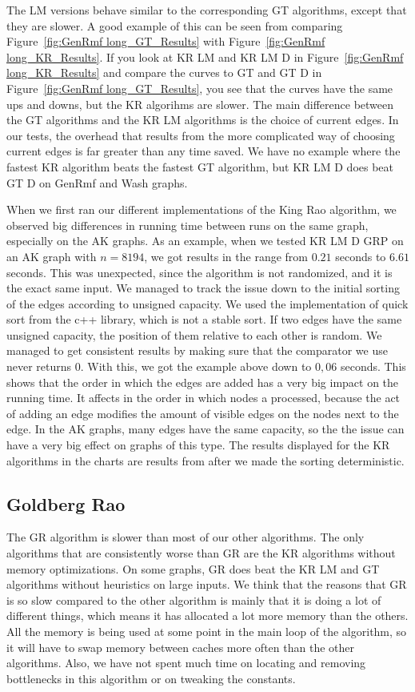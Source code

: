 The LM versions behave similar to the corresponding GT algorithms, except that they are slower.
A good example of this can be seen from comparing Figure~\ref{fig:GenRmf long_GT_Results} with Figure~\ref{fig:GenRmf long_KR_Results}. 
If you look at KR LM and KR LM D in Figure~\ref{fig:GenRmf long_KR_Results} and compare the curves to GT and GT D in Figure~\ref{fig:GenRmf long_GT_Results}, you see that the curves have the same ups and downs, but the KR algorihms are slower.
The main difference between the GT algorithms and the KR LM algorithms is the choice of current edges.
In our tests, the overhead that results from the more complicated way of choosing current edges is far greater than any time saved.
We have no example where the fastest KR algorithm beats the fastest GT algorithm, but KR LM D does beat GT D on GenRmf and Wash graphs.

When we first ran our different implementations of the King Rao algorithm, we observed big differences in running time between runs on the same graph, especially on the AK graphs.
As an example, when we tested KR LM D GRP on an AK graph with $n=8194$, we got results in the range from $0.21$ seconds to $6.61$ seconds.
This was unexpected, since the algorithm is not randomized, and it is the exact same input. 
We managed to track the issue down to the initial sorting of the edges according to unsigned capacity. 
We used the implementation of quick sort from the c++ library, which is not a stable sort. If two edges have the same unsigned capacity, the position of them relative to each other is random.
We managed to get consistent results by making sure that the comparator we use never returns $0$. With this, we got the example above down to $0,06$ seconds.
This shows that the order in which the edges are added has a very big impact on the running time. 
It affects in the order in which nodes a processed, because the act of adding an edge modifies the amount of visible edges on the nodes next to the edge.
In the AK graphs, many edges have the same capacity, so the the issue can have a very big effect on graphs of this type.
The results displayed for the KR algorithms in the charts are results from after we made the sorting deterministic.

\subsection{Goldberg Rao}

The GR algorithm is slower than most of our other algorithms.
The only algorithms that are consistently worse than GR are the KR algorithms without memory optimizations.
On some graphs, GR does beat the KR LM and GT algorithms without heuristics on large inputs.
We think that the reasons that GR is so slow compared to the other algorithm is mainly that it is doing a lot of different things, 
which means it has allocated a lot more memory than the others. 
All the memory is being used at some point in the main loop of the algorithm, so it will have to swap memory between caches more often than the other algorithms.
Also, we have not spent much time on locating and removing bottlenecks in this algorithm or on tweaking the constants.


